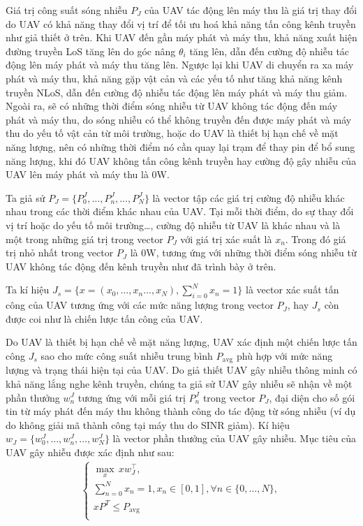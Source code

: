 \documentclass{uetgraduation}
\begin{document}
Giá trị công suất sóng nhiễu $P_J$ của UAV tác động lên máy thu là giá trị thay đổi do UAV có khả năng thay đổi vị trí để tối ưu hoá khả năng tấn công kênh truyền như giả thiết ở trên.
Khi UAV đến gần máy phát và máy thu, khả năng xuất hiện đường truyền LoS tăng lên do góc nâng $\theta_i$
tăng lên, dẫn đến cường độ nhiễu tác động lên máy phát và máy thu tăng lên. Ngược lại khi UAV di chuyển ra xa máy phát và máy thu, khả năng gặp vật cản và các yếu tố như tăng khả năng kênh
truyền NLoS, dẫn đến cường độ nhiễu tác động lên máy phát và máy thu giảm. Ngoài ra, sẽ có những thời điểm sóng nhiễu từ UAV không tác động đến máy phát và máy thu, do sóng nhiễu có thể không
truyền đến được máy phát và máy thu do yếu tố vật cản từ môi trường, hoặc do UAV là thiết bị hạn chế về mặt năng lượng, nên có những thời điểm nó cần quay lại trạm để thay pin để bổ sung năng
lượng, khi đó UAV không tấn công kênh truyền hay cường độ gây nhiễu của UAV lên máy phát và máy thu là 0W.

Ta giả sử $P_J = \{P_0^J, \dots, P_n^J, \dots, P_N^J\}$ là vector tập các giá trị cường độ nhiễu khác nhau trong các thời điểm khác nhau của UAV. Tại mỗi thời điểm, do sự thay đổi vị trí
hoặc do yếu tố môi trường\dots, cường độ nhiễu từ UAV là khác nhau và là một trong những giá trị trong vector $P_J$ với giá trị xác suất là $x_n$. Trong đó giá trị nhỏ nhất trong vector $P_J$
là 0W, tương ứng với những thời điểm sóng nhiễu từ UAV không tác động đến kênh truyền như đã trình bày ở trên.

Ta kí hiệu $J_s = \{x = (x_0, \dots, x_n\dots, x_N), \sum_{i=0}^{N}x_n = 1\}$ là vector xác suất tấn công của UAV tương ứng với các mức năng lượng trong vector $P_J$, hay $J_s$ còn được coi như
là chiến lược tấn công của UAV.

Do UAV là thiết bị hạn chế về mặt năng lượng, UAV xác định một chiến lược tấn công $J_s$ sao cho mức công suất nhiễu trung bình $P_\text{avg}$ phù hợp với mức năng lượng và trạng thái hiện tại của UAV.
Do giả thiết UAV gây nhiễu thông minh có khả năng lắng nghe kênh truyền, chúng ta giả sử UAV gây nhiễu sẽ nhận về một phần thưởng $w_n^J$ tương ứng với mỗi giá trị $P_n^J$ trong vector $P_J$, đại diện
cho số gói tin từ máy phát đến máy thu không thành công do tác động từ sóng nhiễu (ví dụ do không giải mã thành công tại máy thu do SINR giảm). Kí hiệu $w_J = \{w_0^J, \dots, w_n^J, \dots, w_N^J\}$
là vector phần thưởng của UAV gây nhiễu. Mục tiêu của UAV gây nhiễu được xác định như sau:
\begin{align*}
    \begin{cases}
        \underset{x}{\max} \, x w_J^\top, \\
        \sum_{n=0}^{N} x_n = 1, x_n \in [0, 1], \forall n \in \{0, \dots, N\}, \\
        x P^T \leq P_\text{avg} \\
    \end{cases}
\end{align*}
\end{document}
